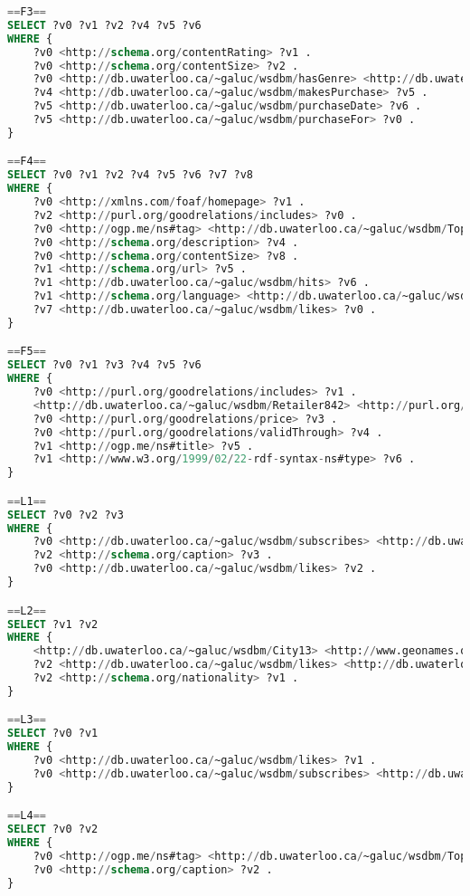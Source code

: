 \begin{lstlisting}[language=SQL, basicstyle=\ttfamily\scriptsize,morekeywords={PREFIX,OPTIONAL,FILTER,java,rdf,rdfs,url},label=watdiv-sparql-queries,basewidth=0.5em]
==F3==
SELECT ?v0 ?v1 ?v2 ?v4 ?v5 ?v6 
WHERE {
    ?v0 <http://schema.org/contentRating> ?v1 .
    ?v0 <http://schema.org/contentSize> ?v2 .
    ?v0 <http://db.uwaterloo.ca/~galuc/wsdbm/hasGenre> <http://db.uwaterloo.ca/~galuc/wsdbm/SubGenre60> .
    ?v4 <http://db.uwaterloo.ca/~galuc/wsdbm/makesPurchase> ?v5 .
    ?v5 <http://db.uwaterloo.ca/~galuc/wsdbm/purchaseDate> ?v6 .
    ?v5 <http://db.uwaterloo.ca/~galuc/wsdbm/purchaseFor> ?v0 .
}

==F4==
SELECT ?v0 ?v1 ?v2 ?v4 ?v5 ?v6 ?v7 ?v8
WHERE {
    ?v0 <http://xmlns.com/foaf/homepage> ?v1 .
    ?v2 <http://purl.org/goodrelations/includes> ?v0 .
    ?v0 <http://ogp.me/ns#tag> <http://db.uwaterloo.ca/~galuc/wsdbm/Topic13> .
    ?v0 <http://schema.org/description> ?v4 .
    ?v0 <http://schema.org/contentSize> ?v8 .
    ?v1 <http://schema.org/url> ?v5 .
    ?v1 <http://db.uwaterloo.ca/~galuc/wsdbm/hits> ?v6 .
    ?v1 <http://schema.org/language> <http://db.uwaterloo.ca/~galuc/wsdbm/Language0> .
    ?v7 <http://db.uwaterloo.ca/~galuc/wsdbm/likes> ?v0 .
}

==F5==
SELECT ?v0 ?v1 ?v3 ?v4 ?v5 ?v6 
WHERE {
    ?v0 <http://purl.org/goodrelations/includes> ?v1 .
    <http://db.uwaterloo.ca/~galuc/wsdbm/Retailer842> <http://purl.org/goodrelations/offers> ?v0 .
    ?v0 <http://purl.org/goodrelations/price> ?v3 .
    ?v0 <http://purl.org/goodrelations/validThrough> ?v4 .
    ?v1 <http://ogp.me/ns#title> ?v5 .
    ?v1 <http://www.w3.org/1999/02/22-rdf-syntax-ns#type> ?v6 .
}

==L1==
SELECT ?v0 ?v2 ?v3 
WHERE {
    ?v0 <http://db.uwaterloo.ca/~galuc/wsdbm/subscribes> <http://db.uwaterloo.ca/~galuc/wsdbm/Website16661> .
    ?v2 <http://schema.org/caption> ?v3 .
    ?v0 <http://db.uwaterloo.ca/~galuc/wsdbm/likes> ?v2 .
}

==L2==
SELECT ?v1 ?v2 
WHERE {
    <http://db.uwaterloo.ca/~galuc/wsdbm/City13> <http://www.geonames.org/ontology#parentCountry> ?v1 .
    ?v2 <http://db.uwaterloo.ca/~galuc/wsdbm/likes> <http://db.uwaterloo.ca/~galuc/wsdbm/Product0> .
    ?v2 <http://schema.org/nationality> ?v1 .
}

==L3==
SELECT ?v0 ?v1 
WHERE {
    ?v0 <http://db.uwaterloo.ca/~galuc/wsdbm/likes> ?v1 .
    ?v0 <http://db.uwaterloo.ca/~galuc/wsdbm/subscribes> <http://db.uwaterloo.ca/~galuc/wsdbm/Website2633> .
}

==L4==
SELECT ?v0 ?v2 
WHERE {
    ?v0 <http://ogp.me/ns#tag> <http://db.uwaterloo.ca/~galuc/wsdbm/Topic96> .
    ?v0 <http://schema.org/caption> ?v2 .
}


\end{lstlisting}
